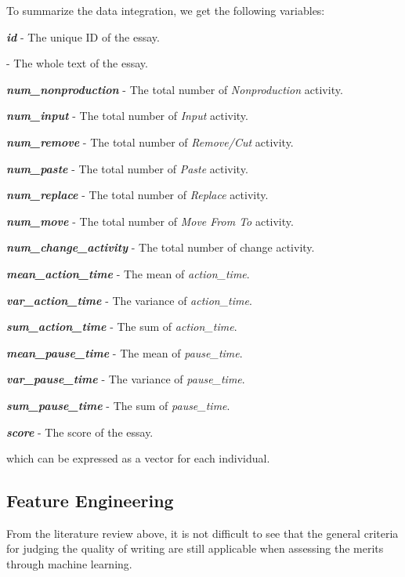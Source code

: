 \documentclass[8pt]{article}
\begin{document}
To summarize the data integration, we get the following variables:
\begin{compactitem}
    \item \textbf{\textit{id}} - The unique ID of the essay.
    \item \textbf{} - The whole text of the essay.
    \item \textbf{\textit{num\_nonproduction}} - The total number of \textit{Nonproduction} activity.
    \item \textbf{\textit{num\_input}} - The total number of \textit{Input} activity.
    \item \textbf{\textit{num\_remove}} - The total number of \textit{Remove/Cut} activity.
    \item \textbf{\textit{num\_paste}} - The total number of \textit{Paste} activity.
    \item \textbf{\textit{num\_replace}} - The total number of \textit{Replace} activity.
    \item \textbf{\textit{num\_move}} - The total number of \textit{Move From To} activity.
    \item \textbf{\textit{num\_change\_activity}} - The total number of change activity.
    \item \textbf{\textit{mean\_action\_time}} - The mean of \textit{action\_time}.
    \item \textbf{\textit{var\_action\_time}} - The variance of \textit{action\_time}.
    \item \textbf{\textit{sum\_action\_time}} - The sum of \textit{action\_time}.
    \item \textbf{\textit{mean\_pause\_time}} - The mean of \textit{pause\_time}.
    \item \textbf{\textit{var\_pause\_time}} - The variance of \textit{pause\_time}.
    \item \textbf{\textit{sum\_pause\_time}} - The sum of \textit{pause\_time}.
    \item \textbf{\textit{score}} - The score of the essay.
\end{compactitem}
which can be expressed as a vector for each individual.

\subsection{Feature Engineering}
From the literature review above, it is not difficult to see that the general criteria for judging the quality of writing are still applicable when assessing the merits through machine learning.
\end{document}
